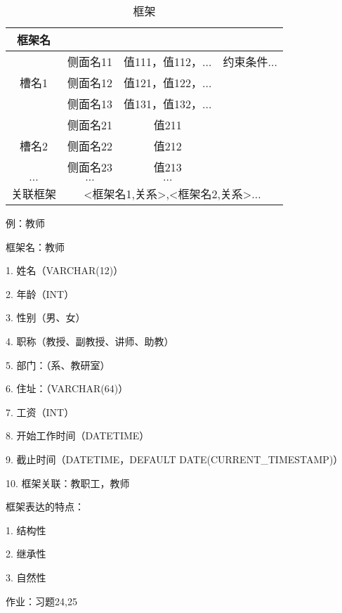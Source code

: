\begin{eg}
    \begin{table}[htpb]
        \centering
        \caption{框架}
        \label{tab:框架}
        \begin{tabular}{|c|c|c|c|}
        \hline
        框架名 &  &  & \\
        \hline
        \multirow{3}{*}{槽名1} & 侧面名11 & 值111，值112，$\ldots$ & 约束条件$\ldots$\\
                               & 侧面名12 & 值121，值122，$\ldots$ & \\
                               & 侧面名13 & 值131，值132，$\ldots$ & \\
                               \hline
        \multirow{3}{*}{槽名2} & 侧面名21 & 值211 & \\
                               & 侧面名22 & 值212 & \\
                               & 侧面名23 & 值213 & \\
                               \hline
        $\ldots$ & $\ldots$ & $\ldots$ & \\
        \hline
        关联框架 & \multicolumn{3}{c|}{<框架名1,关系>,<框架名2,关系>$\ldots$} \\
        \hline
        \end{tabular}
    \end{table}

    例：教师

    框架名：教师

    1. 姓名（VARCHAR(12)）

    2. 年龄（INT）

    3. 性别（男、女）

    4. 职称（教授、副教授、讲师、助教）

    5. 部门：（系、教研室）

    6. 住址：（VARCHAR(64)）

    7. 工资（INT）

    8. 开始工作时间（DATETIME）

    9. 截止时间（DATETIME，DEFAULT DATE(CURRENT\_TIMESTAMP)）

    10. 框架关联：教职工，教师
\end{eg}
\begin{notation}
    框架表达的特点：

    1. 结构性

    2. 继承性

    3. 自然性
\end{notation}
作业：习题24,25

